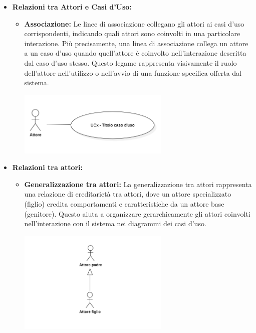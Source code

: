 \documentclass{article}
\begin{document}
\begin{itemize}
    \item \textbf{Relazioni tra Attori e Casi d'Uso:}
    \begin{itemize}
        \item \textbf{Associazione:}
        Le linee di associazione collegano gli attori ai casi d'uso corrispondenti, indicando quali attori sono coinvolti in una particolare interazione. Più precisamente, una linea di associazione collega un attore a un caso d'uso quando quell'attore è coinvolto nell'interazione descritta dal caso d'uso stesso. Questo legame rappresenta visivamente il ruolo dell'attore nell'utilizzo o nell'avvio di una funzione specifica offerta dal sistema.
        \begin{minipage}[t]{\linewidth}
            \centering
            \includegraphics[width=0.6\textwidth]{../Images/NormeDiProgetto/Associazione.PNG}
        \end{minipage}
    \end{itemize}

    \item \textbf{Relazioni tra attori:}
    \begin{itemize}
        \item \textbf{Generalizzazione tra attori:}
        La generalizzazione tra attori rappresenta una relazione di ereditarietà tra attori, dove un attore specializzato (figlio) eredita comportamenti e caratteristiche da un attore base (genitore). Questo aiuta a organizzare gerarchicamente gli attori coinvolti nell'interazione con il sistema nei diagrammi dei casi d'uso.
        \begin{minipage}[t]{\linewidth}
            \centering
            \includegraphics[width=0.6\textwidth]{../Images/NormeDiProgetto/GeneralizzazioneAttori.PNG}
        \end{minipage}
    \end{itemize}
    

\end{itemize}
\end{document}
